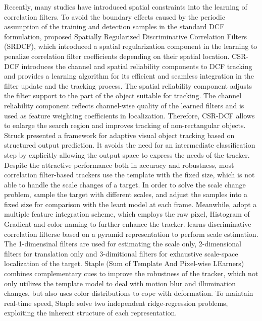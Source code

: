 \documentclass[review]{elsarticle}
\begin{document}
\begin{CJK*}{UTF8}{gbsn}
Recently, many studies \cite{Danelljan2015LearningSR, Lukezic2017DiscriminativeCF} have introduced spatial constraints into the learning of correlation filters.
To avoid the boundary effects caused by the periodic assumption of the training and detection samples in the standard DCF formulation, \cite{Danelljan2015LearningSR} proposed Spatially Regularized Discriminative Correlation Filters (SRDCF), which introduced a spatial regularization component in the learning to penalize correlation filter coefficients depending on their spatial location.
CSR-DCF \cite{Lukezic2017DiscriminativeCF} introduces the channel and spatial reliability components to DCF tracking and provides a learning algorithm for its efficient and seamless integration in the filter update and the tracking process. The spatial reliability component adjusts the filter support to the part of the object suitable for tracking. The channel reliability component reflects channel-wise quality of the learned filters and is used as feature weighting coefficients in localization. Therefore, CSR-DCF allows to enlarge the search region and improves tracking of non-rectangular objects.
Struck \cite{Hare2011StruckSO} presented a framework for adaptive visual object tracking based on structured output prediction. It avoids the need for an intermediate classification step by explicitly allowing the output space to express the needs of the tracker.
Despite the attractive performance both in accuracy and robustness, most correlation filter-based trackers use the template with the fixed size, which is not able to handle the scale changes of a target. In order to solve the scale change problem, \cite{Li2014ASA} sample the target with different scales, and adjust the samples into a fixed size for comparison with the leant model at each frame. Meanwhile, \cite{Li2014ASA} adopt a multiple feature integration scheme, which employs the raw pixel, Histogram of Gradient \cite{Forsyth2014ObjectDW} and color-naming \cite{Weijer2009LearningCN} to further enhance the tracker.
\cite{Danelljan2017DiscriminativeSS} learns discriminative correlation filterse based on a pyramid representation to perform scale estimation. The 1-dimensinal filters are used for estimating the scale only, 2-dimensional filters for translation only and 3-dimitional filters for exhaustive scale-space localization of the target.
Staple (Sum of Template And  Pixel-wise LEarners) \cite{Bertinetto2016StapleC} combines complementary cues to improve the robustness of the tracker, which not only utilizes the template model to deal with motion blur and illumination changes, but also uses color distributions to cope with deformation. To maintain real-time speed, Staple solve two independent ridge-regression problems, exploiting the inherent structure of each representation.


\end{CJK*}
\end{document}
